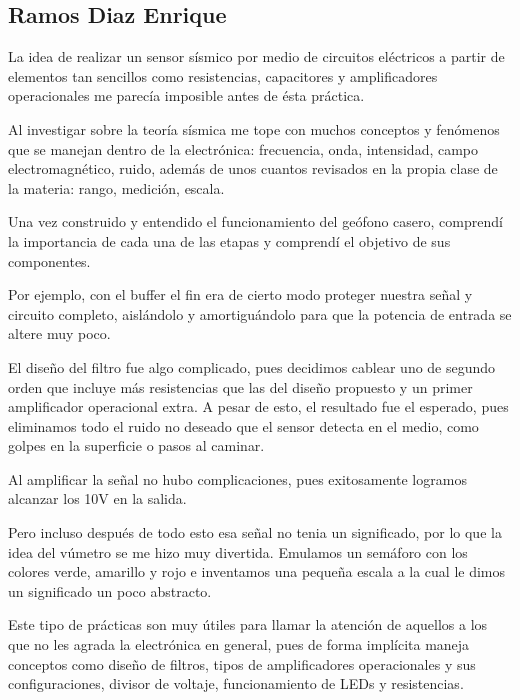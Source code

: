\documentclass[12pt]{article}
\begin{document}
	    \subsection{Ramos Diaz Enrique}
	    La idea de realizar un sensor sísmico por medio de circuitos eléctricos a partir de elementos tan sencillos como resistencias, capacitores y amplificadores operacionales me parecía imposible antes de ésta práctica.
	    
	    Al investigar sobre la teoría sísmica me tope con muchos conceptos y fenómenos que se manejan dentro de la electrónica: frecuencia, onda, intensidad, campo electromagnético, ruido, además de unos cuantos revisados en la propia clase de la materia: rango, medición, escala.
	    
	    Una vez construido y entendido el funcionamiento del geófono casero, comprendí la importancia de cada una de las etapas y comprendí el objetivo de sus componentes.
	    
	    Por ejemplo, con el buffer el fin era de cierto modo proteger nuestra señal y circuito completo, aislándolo y amortiguándolo para que la potencia de entrada se altere muy poco. 
	    
	    El diseño del filtro fue algo complicado, pues decidimos cablear uno de segundo orden que incluye más resistencias que las del diseño propuesto y un primer amplificador operacional extra. A pesar de esto, el resultado fue el esperado, pues eliminamos todo el ruido no deseado que el sensor detecta en el medio, como golpes en la superficie o pasos al caminar.
	    
	    Al amplificar la señal no hubo complicaciones, pues exitosamente logramos alcanzar los 10V en la salida.
	    
	    Pero incluso después de todo esto esa señal no tenia un significado, por lo que la idea del vúmetro se me hizo muy divertida. Emulamos un semáforo con los colores verde, amarillo y rojo e inventamos una pequeña escala a la cual le dimos un significado un poco abstracto.
	    
	    Este tipo de prácticas son muy útiles para llamar la atención de aquellos a los que no les agrada la electrónica en general, pues de forma implícita maneja conceptos como diseño de filtros, tipos de amplificadores operacionales y sus configuraciones, divisor de voltaje, funcionamiento de LEDs y resistencias.
	    
	    
	    
	    

\newpage
	
\end{document}
